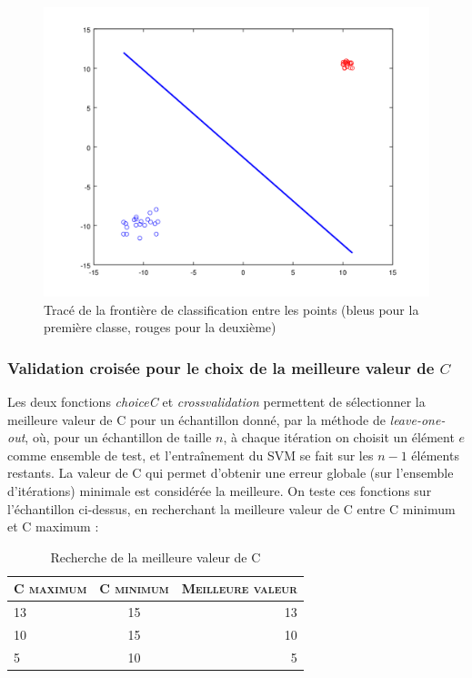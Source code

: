 \documentclass{article}
\begin{document}
         \begin{figure}
           \begin{center}
             \subfigure\includegraphics[scale=0.3]{images/line2D2.png}
             \caption{Tracé de la frontière de classification entre les points (bleus pour la première classe, rouges pour la deuxième)}
           \end{center}
         \end{figure}

\subsubsection{Validation croisée pour le choix de la meilleure valeur de $C$}

Les deux fonctions \emph{choiceC} et \emph{crossvalidation} permettent de sélectionner la meilleure valeur de C pour un échantillon donné, par la méthode de \emph{leave-one-out}, où, pour un échantillon de taille $n$, à chaque itération on choisit un élément $e$ comme ensemble de test, et l'entraînement du SVM se fait sur les $n-1$ éléments restants. La valeur de C qui permet d'obtenir une erreur globale (sur l'ensemble d'itérations) minimale est considérée la meilleure. On teste ces fonctions sur l'échantillon ci-dessus, en recherchant la meilleure valeur de C entre C minimum et C maximum :\\

     \begin{table}[H]
       \caption{Recherche de la meilleure valeur de C}
       \begin{tabular}{|l|c|r|}
         \hline
         \textsc{C maximum} & \textsc{C minimum} & \textsc{Meilleure valeur}\\
         \hline
         13 & 15 & 13\\
         \hline
         10 & 15 & 10\\
         \hline
         5 & 10 & 5\\
         \hline
       \end{tabular}
     \end{table}
\end{document}
